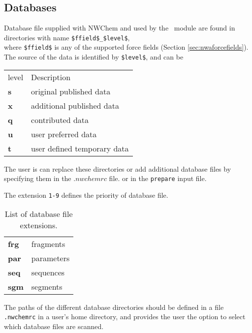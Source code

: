 \subsection{Databases}
Database file supplied with NWChem and used by the \prepare\ module are found in 
directories with name \verb+$ffield$_$level$+, \\
where \verb+$ffield$+ is any of the
supported force fields (Section \ref{sec:nwaforcefields}). 
The source of the data is identified by \verb+$level$+, and can be 
\begin{center}
\begin{tabular}{ll}
\hline
level   & Description                \\
{\bf s} & original published data    \\
{\bf x} & additional published data  \\
{\bf q} & contributed data           \\
{\bf u} & user preferred data        \\
{\bf t} & user defined temporary data\\
\hline
\end{tabular}
\end{center}

The user is can replace these directories or add additional database files
by specifying them in the $.nwchemrc$ file. or in the \verb+prepare+ input file. 

The extension \verb+1-9+ defines the priority of database file.
 
\begin{table}[htbp]
\begin{center}
\begin{tabular}{ll}
{\bf frg} & fragments\\
{\bf par} & parameters\\
{\bf seq} & sequences\\
{\bf sgm} & segments\\
\end{tabular}
\end{center}
\caption{List of database file extensions.}
\end{table}


The paths of the different database directories should be defined in a file 
{\tt .nwchemrc} in a user's home directory, and provides the user the
option to select which database files are scanned.

